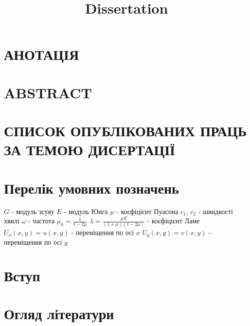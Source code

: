 \documentclass[a4paper,14pt]{extarticle}
\title{Dissertation}
\author{}
\date{}
\numberwithin{equation}{section}
\begin{document}
\section*{\centering АНОТАЦІЯ}


\section*{\centering ABSTRACT}


\section*{\centering СПИСОК ОПУБЛІКОВАНИХ ПРАЦЬ ЗА ТЕМОЮ ДИСЕРТАЦІЇ}


\newpage

\renewcommand{\contentsname}{\centering Зміст}
\renewcommand{\bibname}{Література}
\tableofcontents

\newpage

\section*{\centering Перелік умовних позначень}
$G$ - модуль зсуву \newline
$E$ - модуль Юнга \newline
$\mu$ - коєфіцієнт Пуасона \newline
$c_1$, $c_2$ - швидкості хвилі \newline
$\omega$ - частота \newline
$\mu_0 = \frac{1}{1 - 2\mu}$ \newline
$\lambda = \frac{\mu E}{(1 + \mu) (1 - 2\mu)}$ - коєфіцієнт Ламе \newline
$U_x(x,y) = u(x,y)$ - переміщення по осі $x$ \newline
$U_y(x,y) = v(x,y)$ - переміщення по осі $y$
\newpage

\section*{\centering Вступ}

\newpage

\section[Огляд літератури]{\centering Огляд літератури}

\newpage
\end{document}
